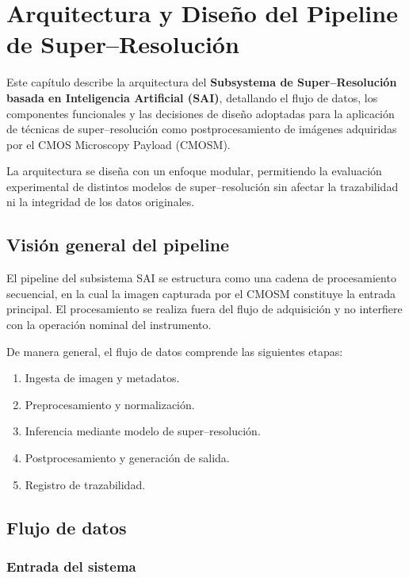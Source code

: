 \chapter{Arquitectura y Diseño del Pipeline de Super--Resolución}
\label{ch:arquitectura}

Este capítulo describe la arquitectura del \textbf{Subsystema de Super--Resolución
basada en Inteligencia Artificial (SAI)}, detallando el flujo de datos, los
componentes funcionales y las decisiones de diseño adoptadas para la aplicación
de técnicas de super--resolución como postprocesamiento de imágenes adquiridas
por el CMOS Microscopy Payload (CMOSM).

La arquitectura se diseña con un enfoque modular, permitiendo la evaluación
experimental de distintos modelos de super--resolución sin afectar la
trazabilidad ni la integridad de los datos originales.

\section{Visión general del pipeline}

El pipeline del subsistema SAI se estructura como una cadena de procesamiento
secuencial, en la cual la imagen capturada por el CMOSM constituye la entrada
principal. El procesamiento se realiza fuera del flujo de adquisición y no
interfiere con la operación nominal del instrumento.

De manera general, el flujo de datos comprende las siguientes etapas:

\begin{enumerate}
    \item Ingesta de imagen y metadatos.
    \item Preprocesamiento y normalización.
    \item Inferencia mediante modelo de super--resolución.
    \item Postprocesamiento y generación de salida.
    \item Registro de trazabilidad.
\end{enumerate}

\section{Flujo de datos}

\subsection{Entrada del sistema}

